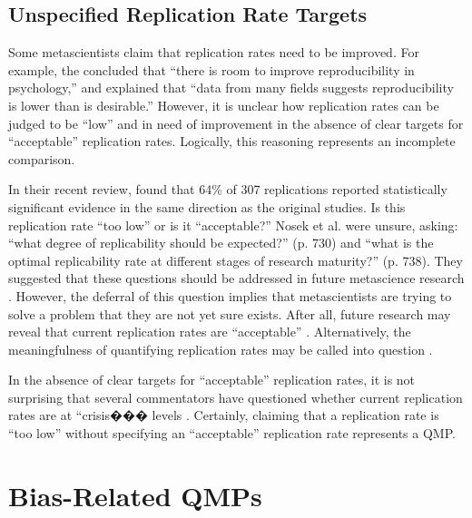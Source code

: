 \documentclass[authordate, meta, issue]{jote-new-article}
\begin{document}
\subsection{Unspecified Replication Rate Targets}



Some metascientists claim that replication rates need to be improved. For example, the \textcite[p. 7]{Collaboration2015} concluded that “there is room to improve reproducibility in psychology,” and  \textcite[p. 1]{Munafò2017} explained that “data from many fields suggests reproducibility is lower than is desirable.” However, it is unclear how replication rates can be judged to be “low” and in need of improvement in the absence of clear targets for “acceptable” replication rates. Logically, this reasoning represents an incomplete comparison.



In their recent review,\textcite{Nosek2022} found that 64\% of 307 replications reported statistically significant evidence in the same direction as the original studies. Is this replication rate “too low” or is it “acceptable?” Nosek et al. were unsure, asking: “what degree of replicability should be expected?” (p. 730) and “what is the optimal replicability rate at different stages of research maturity?” (p. 738). They suggested that these questions should be addressed in future metascience research \parencite[see also][p. 7]{Collaboration2015}. However, the deferral of this question implies that metascientists are trying to solve a problem that they are not yet sure exists. After all, future research may reveal that current replication rates are “acceptable” \parencites{Bird2020}[p. 692]{Freiling2021}[p. 8]{Guttinger2020}{Lewandowsky2020}. Alternatively, the meaningfulness of quantifying replication rates may be called into question \parencites{Buzbas2023}{Rubin2021a}.



In the absence of clear targets for “acceptable” replication rates, it is not surprising that several commentators have questioned whether current replication rates are at “crisis��� levels \parencites[e.g.,][]{Barrett2015}{Bird2020}{Buzbas2023}{Fanelli2018}{Firestein2016}{Freiling2021}{Haig2022}{Maxwell2015}{Morawski2019}{Shrout2018}{Stroebe2014}{Wood2019}. Certainly, claiming that a replication rate is “too low” without specifying an “acceptable” replication rate represents a QMP.



\section{Bias-Related QMPs}
\end{document}
